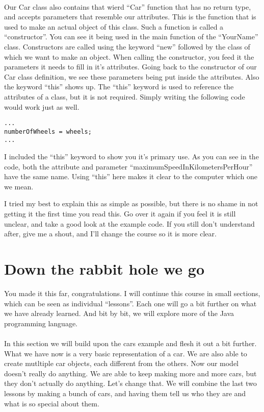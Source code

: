\documentclass[11pt,fleqn]{book} %
\begin{document}
 \paragraph{} Our Car class also contains that wierd ``Car'' function that has no return type, and accepts parameters that resemble our attributes. This is the function that is used to make an actual object of this class. Such a function is called a ``constructor''. You can see it being used in the main function of the ``YourName'' class. Constructors are called using the keyword ``new'' followed by the class of which we want to make an object. When calling the constructor, you feed it the parameters it needs to fill in it's attributes.
Going back to the constructor of our Car class definition, we see these parameters being put inside the attributes. Also the keyword ``this'' shows up. The ``this'' keyword is used to reference the attributes of a class, but it is not required. Simply writing the following code would work just as well. 
\begin{lstlisting}
...
numberOfWheels = wheels;
...
\end{lstlisting}
I included the ``this'' keyword to show you it's primary use. As you can see in the code, both the attribute and parameter ``maximumSpeedInKilometersPerHour'' have the same name. Using ``this'' here makes it clear to the computer which one we mean.
 
 
\begin{remark}
	I tried my best to explain this as simple as possible, but there is no shame in not getting it the first time you read this. Go over it again if you feel it is still unclear, and take a good look at 	the example code. If you still don't understand after, give me a shout, and I'll change the course so it is more clear.
\end{remark}

\newpage
\section{Down the rabbit hole we go}

\begin{remark}
You made it this far, congratulations. I will continue this course in small sections, which can be seen as individual ``lessons''. Each one will go a bit further on what we have already learned. And bit by bit, we will explore more of the Java programming language.
\end{remark}

\paragraph{} In this section we will build upon the cars example and flesh it out a bit further. What we have now is a very basic representation of a car. We are also able to create mutltiple car objects, each different from the others. Now our model doesn't really do anything. We are able to keep making more and more cars, but they don't actually do anything. Let's change that.
We will combine the last two lessons by making a bunch of cars, and having them tell us who they are and what is so special about them.
\end{document}
